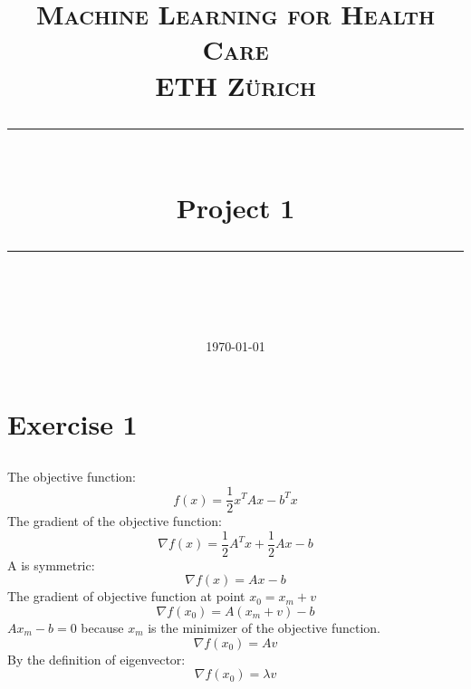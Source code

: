 \documentclass[11pt]{scrartcl}
\title{	
	\normalfont\normalsize
	\textsc{Machine Learning for Health Care\\%
	ETH Zürich}\\
	\vspace{25pt}
	\rule{\linewidth}{0.5pt}\\
	\vspace{20pt}
	{\huge Project 1}\\
	\vspace{12pt}
	\rule{\linewidth}{1pt}\\
	\vspace{12pt}
}
\author{\LARGE \thestudent}
\date{\normalsize\today}
\begin{document}
\maketitle
\newpage

\section{Exercise 1}
\subsection{}
The objective function:
$$ f(x) = \frac{1}{2}x^T A x - b^Tx$$
The gradient of the objective function:
$$\nabla f(x) = \frac{1}{2}A^T x + \frac{1}{2}Ax - b $$
A is symmetric: 
$$\nabla f(x) = Ax - b $$
The gradient of objective function at point $x_0 = x_m + v$
$$\nabla f(x_0) = A(x_m + v) - b $$
$Ax_m - b = 0$ because $x_m$ is the minimizer of the objective function.
$$\nabla f(x_0) = Av $$
By the definition of eigenvector:
$$\nabla f(x_0) = \lambda v $$
\end{document}
